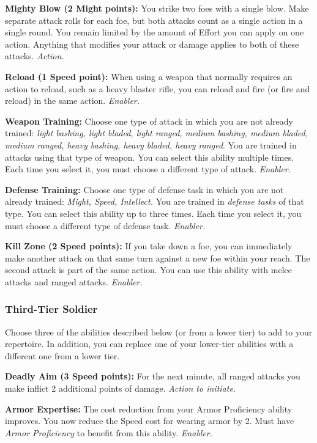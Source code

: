 \documentclass[a4paper,10pt,final,twocolumn,oneside]{book}
\newcommand{\itemAbility}[2]{\textcolor{25gray}{\textbullet\textbf{ #1:}}{ #2}\par}
\newcommand{\enabler}{\textit{ Enabler.}}
\newcommand{\action}{\textit{ Action.}}
\newcommand{\actionInit}{\textit{ Action to initiate.}}
\begin{document}
\itemAbility{Mighty Blow (2 Might points)}{You strike two foes with a single blow. Make separate attack rolls for each foe, but both attacks count as a single action in a single round. You remain limited by the amount of Effort you can apply on one action. Anything that modifies your attack or damage applies to both of these attacks.\action}

\itemAbility{Reload (1 Speed point)}{When using a weapon that normally requires an action to reload, such as a heavy blaster rifle, you can reload and fire (or fire and reload) in the same action.\enabler}

\itemAbility{Weapon Training}{Choose one type of attack in which you are not already trained: \textit{light bashing, light bladed, light ranged, medium bashing, medium bladed, medium ranged, heavy bashing, heavy bladed, heavy ranged}. You are trained in attacks using that type of weapon. You can select this ability multiple times. Each time you select it, you must choose a different type of attack.\enabler}

\itemAbility{Defense Training}{Choose one type of defense task in which you are not already trained: \textit{Might, Speed, Intellect.} You are trained in \emph{defense tasks} of that type. You can select this ability up to three times. Each time you select it, you must choose a different type of defense task.\enabler}

\itemAbility{Kill Zone (2 Speed points)}{If you take down a foe, you can immediately make another attack on that same turn against a new foe within your reach. The second attack is part of the same action. You can use this ability with melee attacks and ranged attacks.\enabler}


\subsubsection*{Third-Tier Soldier}
\label{subsub:soldierThirdTier}

Choose three of the abilities described below (or from a lower tier) to add to your repertoire. In addition, you can replace one of your lower-tier abilities with a different one from a lower tier.

\itemAbility{Deadly Aim (3 Speed points)}{For the next minute, all ranged attacks you make inflict 2 additional points of damage.\actionInit}

\itemAbility{Armor Expertise}{The cost reduction from your Armor Proficiency ability improves. You now reduce the Speed cost for wearing armor by 2. Must have \textit{Armor Proficiency} to benefit from this ability.\enabler}
\end{document}
